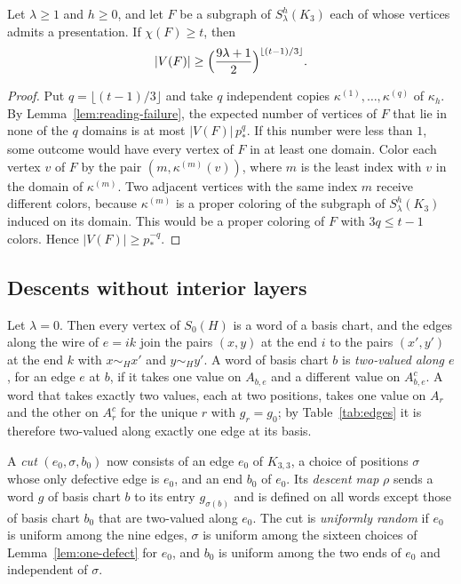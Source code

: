 \begin{proposition}\label{prop:readings}
Let $\lambda\ge1$ and $h\ge0$, and let $F$ be a subgraph of $S^h_\lambda(K_3)$ each of whose vertices admits a presentation. If $\chi(F)\ge t$, then
\[
 |V(F)|\ge\Bigl(\frac{9\lambda+1}{2}\Bigr)^{\lfloor(t-1)/3\rfloor}.
\]
\end{proposition}
\begin{proof}
Put $q=\lfloor(t-1)/3\rfloor$ and take $q$ independent copies $\kappa^{(1)},\ldots,\kappa^{(q)}$ of $\kappa_h$. By Lemma~\ref{lem:reading-failure}, the expected number of vertices of $F$ that lie in none of the $q$ domains is at most $|V(F)|\,p_*^q$. If this number were less than $1$, some outcome would have every vertex of $F$ in at least one domain. Color each vertex $v$ of $F$ by the pair $(m,\kappa^{(m)}(v))$, where $m$ is the least index with $v$ in the domain of $\kappa^{(m)}$. Two adjacent vertices with the same index $m$ receive different colors, because $\kappa^{(m)}$ is a proper coloring of the subgraph of $S^h_\lambda(K_3)$ induced on its domain. This would be a proper coloring of $F$ with $3q\le t-1$ colors. Hence $|V(F)|\ge p_*^{-q}$.
\end{proof}

\subsection{Descents without interior layers}\label{app:descent-zero}

Let $\lambda=0$. Then every vertex of $S_0(H)$ is a word of a basis chart, and the edges along the wire of $e=ik$ join the pairs $(x,y)$ at the end $i$ to the pairs $(x',y')$ at the end $k$ with $x\sim_Hx'$ and $y\sim_Hy'$. A word of basis chart $b$ is \emph{two-valued along $e$}, for an edge $e$ at $b$, if it takes one value on $A_{b,e}$ and a different value on $A_{b,e}^c$. A word that takes exactly two values, each at two positions, takes one value on $A_r$ and the other on $A_r^c$ for the unique $r$ with $g_r=g_0$; by Table~\ref{tab:edges} it is therefore two-valued along exactly one edge at its basis.

A \emph{cut} $(e_0,\sigma,b_0)$ now consists of an edge $e_0$ of $K_{3,3}$, a choice of positions $\sigma$ whose only defective edge is $e_0$, and an end $b_0$ of $e_0$. Its \emph{descent map} $\rho$ sends a word $g$ of basis chart $b$ to its entry $g_{\sigma(b)}$ and is defined on all words except those of basis chart $b_0$ that are two-valued along $e_0$. The cut is \emph{uniformly random} if $e_0$ is uniform among the nine edges, $\sigma$ is uniform among the sixteen choices of Lemma~\ref{lem:one-defect} for $e_0$, and $b_0$ is uniform among the two ends of $e_0$ and independent of $\sigma$.

